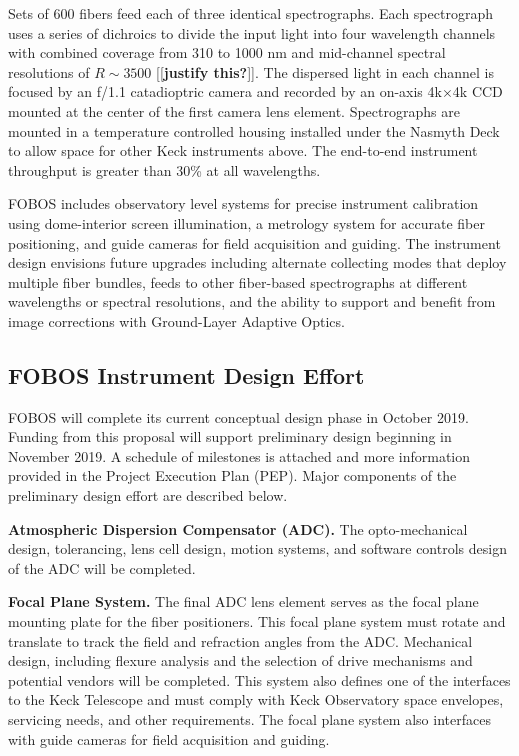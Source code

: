 \documentclass[oneside,11pt]{amsart}
\newcommand{\comment}[2][todo]{{\color{#1}[[{\bf #2}]]}}
\begin{document}
Sets of 600 fibers feed each of three identical spectrographs.  Each spectrograph uses a series of dichroics to divide
the input light into four wavelength channels with combined coverage from 310 to 1000 nm and mid-channel spectral
resolutions of $R \sim 3500$ \comment{justify this?}.  The dispersed light in each channel is focused by an f/1.1 catadioptric camera and
recorded by an on-axis 4k$\times$4k CCD mounted at the center of the first camera lens element.  Spectrographs are
mounted in a temperature controlled housing installed under the Nasmyth Deck to allow space for other Keck instruments
above.  The end-to-end instrument throughput is greater than 30\% at all wavelengths.

FOBOS includes observatory level systems for precise instrument calibration using dome-interior screen illumination, a
metrology system for accurate fiber positioning, and guide cameras for field acquisition and guiding.  The instrument
design envisions future upgrades including alternate collecting modes that deploy multiple fiber bundles, feeds to
other fiber-based spectrographs at different wavelengths or spectral resolutions, and the ability to support and
benefit from image corrections with Ground-Layer Adaptive Optics.



\subsection{FOBOS Instrument Design Effort}
\label{sec:design}

FOBOS will complete its current conceptual design phase in October 2019.  Funding from this proposal will support preliminary design beginning in November 2019.  A schedule of milestones is attached and more information provided in the Project Execution Plan (PEP).  Major components of the preliminary design effort are described below.

\noindent \textbf{Atmospheric Dispersion Compensator (ADC).} The opto-mechanical design, tolerancing, lens cell design, motion systems, and software controls design of the ADC will be completed.  

\noindent \textbf{Focal Plane System.} The final ADC lens element serves as the focal plane mounting plate for the fiber positioners.  This focal plane system must rotate and translate to track the field and refraction angles from the ADC.  Mechanical design, including flexure analysis and the selection of drive mechanisms and potential vendors will be completed.  This system also defines one of the interfaces to the Keck Telescope and must comply with Keck Observatory space envelopes, servicing needs, and other requirements.  The focal plane system also interfaces with guide cameras for field acquisition and guiding.
\end{document}
